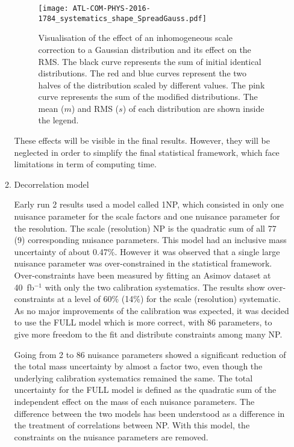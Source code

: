 \begin{enumerate}
\begin{enumerate}
\begin{figure}[htbp]
\centering
\texttt{[image: ATL-COM-PHYS-2016-1784\_systematics\_shape\_SpreadGauss.pdf]}
\caption{\label{fig:org861f6a5}
  Visualisation of the effect of an inhomogeneous scale correction to a Gaussian distribution and its effect on the RMS.
  The black curve represents the sum of initial identical distributions.
  The red and blue curves represent the two halves of the distribution scaled by different values.
  The pink curve represents the sum of the modified distributions.
  The mean (\(m\)) and RMS (\(s\)) of each distribution are shown inside the legend.}
\end{figure}

These effects will be visible in the final results.
However, they will be neglected in order to simplify the final statistical framework, which face limitations in term of computing time.

\item Decorrelation model
\label{sec:org572f644}
\label{subsec:decorrelation_model}

Early run 2 results used a model called 1NP, which consisted in only one nuisance parameter for the scale factors and one nuisance parameter for the resolution.
The scale (resolution) NP is the quadratic sum of all 77 (9) corresponding nuisance parameters.
This model had an inclusive mass uncertainty of about 0.47\%.
However it was observed that a single large nuisance parameter was over-constrained in the statistical framework.
Over-constraints have been measured by fitting an Asimov dataset at 40~fb$^{-1}$ with only the two calibration systematics.
The results show over-constraints at a level of 60\% (14\%) for the scale (resolution) systematic.
As no major improvements of the calibration was expected, it was decided to use the FULL model which is more correct, with 86 parameters, to give more freedom to the fit and distribute constraints among many NP.

Going from 2 to 86 nuisance parameters showed a significant reduction of the total mass uncertainty by almost a factor two, even though the underlying calibration systematics remained the same.
The total uncertainty for the FULL model is defined as the quadratic sum of the independent effect on the mass of each nuisance parameters.
The difference between the two models has been understood as a difference in the treatment of correlations between NP.
With this model, the constraints on the nuisance parameters are removed.


\end{enumerate}
\end{enumerate}

